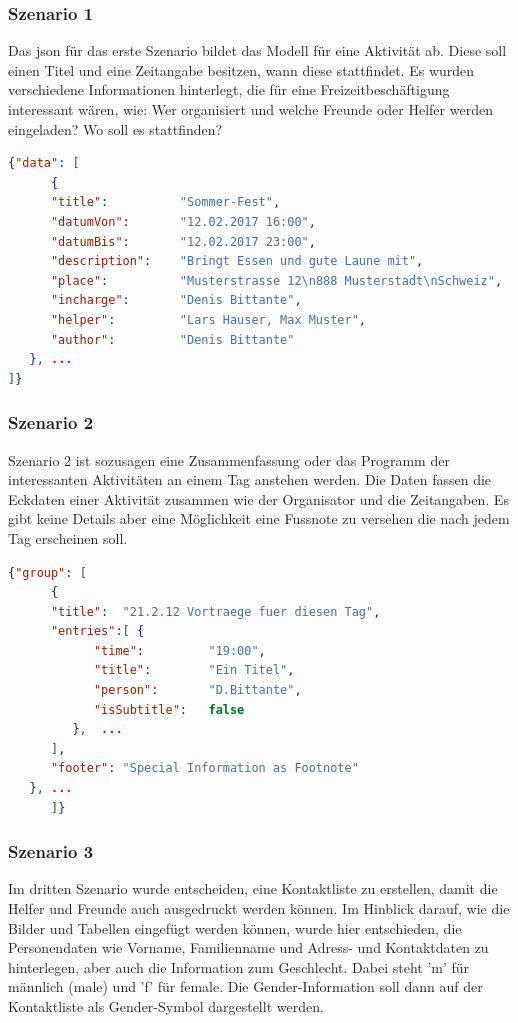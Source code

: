 \documentclass[main.tex]{subfiles}
\begin{document}
\subsubsection{Szenario 1}
Das \acrlong{json} für das erste Szenario bildet das Modell für eine Aktivität ab. Diese soll einen Titel und eine Zeitangabe besitzen, wann diese stattfindet. Es wurden verschiedene Informationen hinterlegt, die für eine Freizeitbeschäftigung interessant wären, wie: Wer organisiert und welche Freunde oder Helfer werden eingeladen? Wo soll es stattfinden?  
\begin{lstlisting}[language=json]
{"data": [
      {
      "title":          "Sommer-Fest",
      "datumVon":       "12.02.2017 16:00",
      "datumBis":       "12.02.2017 23:00",
      "description":    "Bringt Essen und gute Laune mit",
      "place":          "Musterstrasse 12\n888 Musterstadt\nSchweiz",
      "incharge":       "Denis Bittante",
      "helper":         "Lars Hauser, Max Muster",
      "author":         "Denis Bittante"
   }, ...
]}


\end{lstlisting}


\subsubsection{Szenario 2}
Szenario 2 ist sozusagen eine Zusammenfassung oder das Programm der interessanten Aktivitäten an einem Tag anstehen werden. Die Daten fassen die Eckdaten einer Aktivität zusammen wie der Organisator und die Zeitangaben. Es gibt keine Details aber eine Möglichkeit eine Fussnote zu versehen die nach jedem Tag erscheinen soll. 
\begin{lstlisting}[language=json]
{"group": [
      {
      "title":  "21.2.12 Vortraege fuer diesen Tag",
      "entries":[ {
            "time":         "19:00",
            "title":        "Ein Titel",
            "person":       "D.Bittante",
            "isSubtitle":   false
         },  ...
      ],
      "footer": "Special Information as Footnote"
   }, ...
      ]}


\end{lstlisting}


\subsubsection{Szenario 3}

Im dritten Szenario wurde entscheiden, eine Kontaktliste zu erstellen, damit die Helfer und Freunde auch ausgedruckt werden können. Im Hinblick darauf, wie die Bilder und Tabellen eingefügt werden können, wurde hier entschieden, die Personendaten wie Vorname, Familienname und Adress- und Kontaktdaten zu hinterlegen, aber auch die Information zum Geschlecht. Dabei steht ’m’ für männlich (male) und ’f’ für female. Die Gender-Information soll dann auf der Kontaktliste als Gender-Symbol dargestellt werden.
\end{document}
